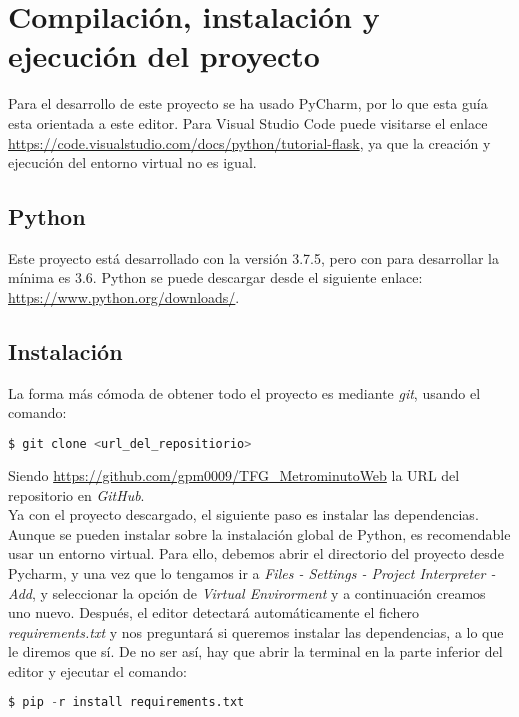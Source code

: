 \section{Compilación, instalación y ejecución del proyecto}
Para el desarrollo de este proyecto se ha usado PyCharm, por lo que esta guía esta orientada a este editor. Para Visual Studio Code puede visitarse el enlace \url{https://code.visualstudio.com/docs/python/tutorial-flask}, ya que la creación y ejecución del entorno virtual no es igual.

\subsection{Python}
Este proyecto está desarrollado con la versión 3.7.5, pero con para desarrollar la mínima es 3.6. Python se puede descargar desde el siguiente enlace: \url{https://www.python.org/downloads/}.

\subsection{Instalación}
La forma más cómoda de obtener todo el proyecto es mediante \textit{git}, usando el comando:
\renewcommand{\lstlistingname}{Instalación}%
\renewcommand{\lstlistlistingname}{List of \lstlistingname s}
\begin{lstlisting}[language=python,caption={Descargar el repositorio.}]
 $ git clone <url_del_repositiorio>
\end{lstlisting}
Siendo \url{https://github.com/gpm0009/TFG_MetrominutoWeb} la URL del repositorio en \textit{GitHub}.
\\
Ya con el proyecto descargado, el siguiente paso es instalar las dependencias. Aunque se pueden instalar sobre la instalación global de Python, es recomendable usar un entorno virtual. Para ello, debemos abrir el directorio del proyecto desde Pycharm, y una vez que lo tengamos ir a \textit{Files - Settings - Project Interpreter - Add}, y seleccionar la opción de \textit{Virtual Envirorment} y a continuación creamos uno nuevo.
Después, el editor detectará automáticamente el fichero \textit{requirements.txt} y nos preguntará si queremos instalar las dependencias, a lo que le diremos que sí. De no ser así, hay que abrir la terminal en la parte inferior del editor y ejecutar el comando:
\begin{lstlisting}[language=python,caption={Instalar dependencias en el entorno virtual.}]
$ pip -r install requirements.txt
\end{lstlisting}

